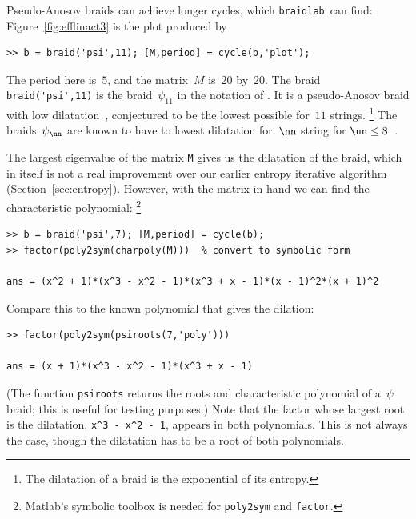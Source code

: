 \documentclass[12pt]{article}
\newcommand{\braidlab}{\texttt{braidlab}}%
\newcommand{\braid}{\texttt{braid}}%
\begin{document}
Pseudo-Anosov braids %
%
can achieve longer cycles, which \braidlab\ can find:
Figure~\ref{fig:efflinact3} is the plot produced by
\begin{lstlisting}[frame=single,framerule=0pt]
>> b = braid('psi',11); [M,period] = cycle(b,'plot');
\end{lstlisting}
The period here is~$5$, and the matrix~$M$ is~$20$ by~$20$.  The braid %
%
%
\lstinline{braid('psi',11)} is the braid~$\psi_{11}$ in the notation of
\citet{Venzke_thesis}.  It is a pseudo-Anosov braid with low %
%
%
dilatation~\citep{Hironaka2006,Thiffeault2006}, conjectured to be the lowest
possible for~$11$ strings.%
%
\footnote{The dilatation of a braid is the exponential of its entropy.}
%
The braids~$\psi_\nn$ are known to have to lowest dilatation for~$\nn$ string
for $\nn\le8$~\citep{LanneauThiffeault2011_braids}.

The largest eigenvalue of the matrix \lstinline{M} gives us the
%
dilatation of the braid, which in itself is not a real improvement over our
earlier entropy iterative algorithm (Section~\ref{sec:entropy}).  However,
with the matrix in hand we can find the characteristic polynomial:%
\footnote{Matlab's symbolic toolbox %
%
is needed for \lstinline{poly2sym} and \lstinline{factor}.}
\begin{lstlisting}[frame=single,framerule=0pt]
>> b = braid('psi',7); [M,period] = cycle(b);
>> factor(poly2sym(charpoly(M)))  % convert to symbolic form

ans = (x^2 + 1)*(x^3 - x^2 - 1)*(x^3 + x - 1)*(x - 1)^2*(x + 1)^2
\end{lstlisting}
\index{braid class@\braid\ class!cycle@\lstinline{cycle}|)}%
Compare this to the known polynomial that gives the dilation:
\begin{lstlisting}[frame=single,framerule=0pt]
>> factor(poly2sym(psiroots(7,'poly')))

ans = (x + 1)*(x^3 - x^2 - 1)*(x^3 + x - 1)
\end{lstlisting}
(The function \lstinline{psiroots} returns the roots and characteristic
polynomial of a~$\psi$ braid; this is useful for testing purposes.)  Note that
the factor whose largest root is the dilatation, %
%
\lstinline{x^3 - x^2 - 1}, appears in both polynomials.  This is not always
the case, though the dilatation has to be a root of both polynomials.
%
\end{document}

